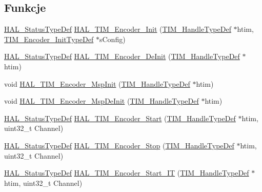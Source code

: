 \subsection*{Funkcje}
\begin{DoxyCompactItemize}
\item 
\hyperlink{stm32f4xx__hal__def_8h_a63c0679d1cb8b8c684fbb0632743478f}{H\+A\+L\+\_\+\+Status\+Type\+Def} \hyperlink{group___t_i_m___exported___functions___group6_ga16beb79937c32f993bbc4fdc1e492c52}{H\+A\+L\+\_\+\+T\+I\+M\+\_\+\+Encoder\+\_\+\+Init} (\hyperlink{struct_t_i_m___handle_type_def}{T\+I\+M\+\_\+\+Handle\+Type\+Def} $\ast$htim, \hyperlink{struct_t_i_m___encoder___init_type_def}{T\+I\+M\+\_\+\+Encoder\+\_\+\+Init\+Type\+Def} $\ast$s\+Config)
\item 
\hyperlink{stm32f4xx__hal__def_8h_a63c0679d1cb8b8c684fbb0632743478f}{H\+A\+L\+\_\+\+Status\+Type\+Def} \hyperlink{group___t_i_m___exported___functions___group6_gaaf99281fd7635e20c08e48bfc9ea11e3}{H\+A\+L\+\_\+\+T\+I\+M\+\_\+\+Encoder\+\_\+\+De\+Init} (\hyperlink{struct_t_i_m___handle_type_def}{T\+I\+M\+\_\+\+Handle\+Type\+Def} $\ast$htim)
\item 
void \hyperlink{group___t_i_m___exported___functions___group6_ga1a8e1103bfcc56c2626ed5cf546391d1}{H\+A\+L\+\_\+\+T\+I\+M\+\_\+\+Encoder\+\_\+\+Msp\+Init} (\hyperlink{struct_t_i_m___handle_type_def}{T\+I\+M\+\_\+\+Handle\+Type\+Def} $\ast$htim)
\item 
void \hyperlink{group___t_i_m___exported___functions___group6_ga77c8216735a5b1374ea948737eed8a18}{H\+A\+L\+\_\+\+T\+I\+M\+\_\+\+Encoder\+\_\+\+Msp\+De\+Init} (\hyperlink{struct_t_i_m___handle_type_def}{T\+I\+M\+\_\+\+Handle\+Type\+Def} $\ast$htim)
\item 
\hyperlink{stm32f4xx__hal__def_8h_a63c0679d1cb8b8c684fbb0632743478f}{H\+A\+L\+\_\+\+Status\+Type\+Def} \hyperlink{group___t_i_m___exported___functions___group6_ga6450b21fa2bf6bf71a0f85c0a1519e21}{H\+A\+L\+\_\+\+T\+I\+M\+\_\+\+Encoder\+\_\+\+Start} (\hyperlink{struct_t_i_m___handle_type_def}{T\+I\+M\+\_\+\+Handle\+Type\+Def} $\ast$htim, uint32\+\_\+t Channel)
\item 
\hyperlink{stm32f4xx__hal__def_8h_a63c0679d1cb8b8c684fbb0632743478f}{H\+A\+L\+\_\+\+Status\+Type\+Def} \hyperlink{group___t_i_m___exported___functions___group6_ga2d603e9167803b080be1f2915e972bbf}{H\+A\+L\+\_\+\+T\+I\+M\+\_\+\+Encoder\+\_\+\+Stop} (\hyperlink{struct_t_i_m___handle_type_def}{T\+I\+M\+\_\+\+Handle\+Type\+Def} $\ast$htim, uint32\+\_\+t Channel)
\item 
\hyperlink{stm32f4xx__hal__def_8h_a63c0679d1cb8b8c684fbb0632743478f}{H\+A\+L\+\_\+\+Status\+Type\+Def} \hyperlink{group___t_i_m___exported___functions___group6_ga9a573a3203752709841acab8412f541e}{H\+A\+L\+\_\+\+T\+I\+M\+\_\+\+Encoder\+\_\+\+Start\+\_\+\+IT} (\hyperlink{struct_t_i_m___handle_type_def}{T\+I\+M\+\_\+\+Handle\+Type\+Def} $\ast$htim, uint32\+\_\+t Channel)

\end{DoxyCompactItemize}
